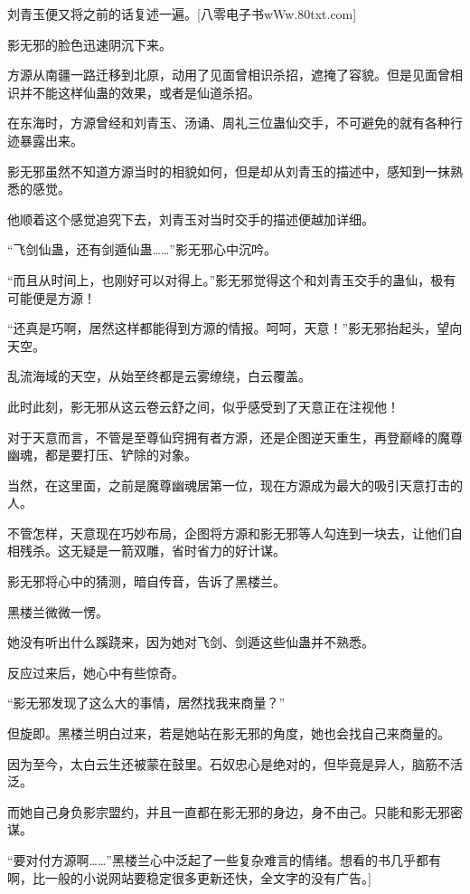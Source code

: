
\begin{this_body}

刘青玉便又将之前的话复述一遍。[八零电子书wWw.80txt.com]

影无邪的脸色迅速阴沉下来。

方源从南疆一路迁移到北原，动用了见面曾相识杀招，遮掩了容貌。但是见面曾相识并不能这样仙蛊的效果，或者是仙道杀招。

在东海时，方源曾经和刘青玉、汤诵、周礼三位蛊仙交手，不可避免的就有各种行迹暴露出来。

影无邪虽然不知道方源当时的相貌如何，但是却从刘青玉的描述中，感知到一抹熟悉的感觉。

他顺着这个感觉追究下去，刘青玉对当时交手的描述便越加详细。

“飞剑仙蛊，还有剑遁仙蛊……”影无邪心中沉吟。

“而且从时间上，也刚好可以对得上。”影无邪觉得这个和刘青玉交手的蛊仙，极有可能便是方源！

“还真是巧啊，居然这样都能得到方源的情报。呵呵，天意！”影无邪抬起头，望向天空。

乱流海域的天空，从始至终都是云雾缭绕，白云覆盖。

此时此刻，影无邪从这云卷云舒之间，似乎感受到了天意正在注视他！

对于天意而言，不管是至尊仙窍拥有者方源，还是企图逆天重生，再登巅峰的魔尊幽魂，都是要打压、铲除的对象。

当然，在这里面，之前是魔尊幽魂居第一位，现在方源成为最大的吸引天意打击的人。

不管怎样，天意现在巧妙布局，企图将方源和影无邪等人勾连到一块去，让他们自相残杀。这无疑是一箭双雕，省时省力的好计谋。

影无邪将心中的猜测，暗自传音，告诉了黑楼兰。

黑楼兰微微一愣。

她没有听出什么蹊跷来，因为她对飞剑、剑遁这些仙蛊并不熟悉。

反应过来后，她心中有些惊奇。

“影无邪发现了这么大的事情，居然找我来商量？”

但旋即。黑楼兰明白过来，若是她站在影无邪的角度，她也会找自己来商量的。

因为至今，太白云生还被蒙在鼓里。石奴忠心是绝对的，但毕竟是异人，脑筋不活泛。

而她自己身负影宗盟约，并且一直都在影无邪的身边，身不由己。只能和影无邪密谋。

“要对付方源啊……”黑楼兰心中泛起了一些复杂难言的情绪。想看的书几乎都有啊，比一般的小说网站要稳定很多更新还快，全文字的没有广告。]


\end{this_body}

